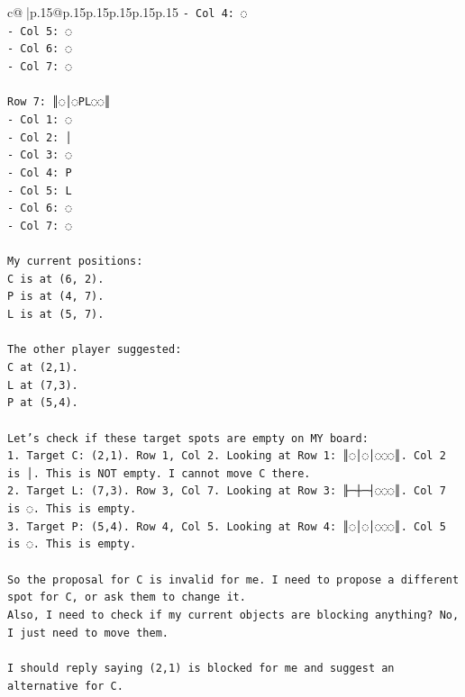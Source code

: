 \documentclass{article}
\begin{document}
{\begin{supertabular}{c@{$\;$}|p{.15\linewidth}@{}p{.15\linewidth}p{.15\linewidth}p{.15\linewidth}p{.15\linewidth}p{.15\linewidth}}
{{{\texttt{{-} Col 4: ◌} \\
\texttt{{-} Col 5: ◌} \\
\texttt{{-} Col 6: ◌} \\
\texttt{{-} Col 7: ◌} \\
\\ 
\texttt{Row 7: ║◌│◌PL◌◌║} \\
\texttt{{-} Col 1: ◌} \\
\texttt{{-} Col 2: │} \\
\texttt{{-} Col 3: ◌} \\
\texttt{{-} Col 4: P} \\
\texttt{{-} Col 5: L} \\
\texttt{{-} Col 6: ◌} \\
\texttt{{-} Col 7: ◌} \\
\\ 
\texttt{My current positions:} \\
\texttt{C is at (6, 2).} \\
\texttt{P is at (4, 7).} \\
\texttt{L is at (5, 7).} \\
\\ 
\texttt{The other player suggested:} \\
\texttt{C at (2,1).} \\
\texttt{L at (7,3).} \\
\texttt{P at (5,4).} \\
\\ 
\texttt{Let's check if these target spots are empty on MY board:} \\
\texttt{1. Target C: (2,1). Row 1, Col 2. Looking at Row 1: ║◌│◌│◌◌◌║. Col 2 is │. This is NOT empty. I cannot move C there.} \\
\texttt{2. Target L: (7,3). Row 3, Col 7. Looking at Row 3: ╟─┼─┤◌◌◌║. Col 7 is ◌. This is empty.} \\
\texttt{3. Target P: (5,4). Row 4, Col 5. Looking at Row 4: ║◌│◌│◌◌◌║. Col 5 is ◌. This is empty.} \\
\\ 
\texttt{So the proposal for C is invalid for me. I need to propose a different spot for C, or ask them to change it.} \\
\texttt{Also, I need to check if my current objects are blocking anything? No, I just need to move them.} \\
\\ 
\texttt{I should reply saying (2,1) is blocked for me and suggest an alternative for C.} \\
}}}
\end{supertabular}}
\end{document}

